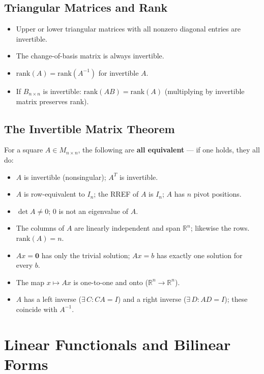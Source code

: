 \documentclass[hidelinks]{article}
\begin{document}
\subsection{Triangular Matrices and Rank}
\begin{itemize}
    \item Upper or lower triangular matrices with all nonzero diagonal entries are invertible.
    \item The change-of-basis matrix is always invertible.
    \item $\mathrm{rank}(A) = \mathrm{rank}(A^{-1})$ for invertible $A$.
    \item If $B_{n\times n}$ is invertible: $\mathrm{rank}(AB) = \mathrm{rank}(A)$ (multiplying by invertible matrix preserves rank).
\end{itemize}

\subsection{The Invertible Matrix Theorem}
For a square $A\in M_{n\times n}$, the following are \textbf{all equivalent} — if one holds, they all do:
\begin{itemize}
    \item $A$ is invertible (nonsingular); $A^T$ is invertible.
    \item $A$ is row-equivalent to $I_n$; the RREF of $A$ is $I_n$; $A$ has $n$ pivot positions.
    \item $\det A \neq 0$; $0$ is not an eigenvalue of $A$.
    \item The columns of $A$ are linearly independent and span $\mathbb{R}^n$; likewise the rows. $\mathrm{rank}(A) = n$.
    \item $Ax=\mathbf 0$ has only the trivial solution; $Ax=b$ has exactly one solution for every $b$.
    \item The map $x\mapsto Ax$ is one-to-one and onto ($\mathbb{R}^n\to\mathbb{R}^n$).
    \item $A$ has a left inverse ($\exists\,C: CA=I$) and a right inverse ($\exists\,D: AD=I$); these coincide with $A^{-1}$.
\end{itemize}

\section{Linear Functionals and Bilinear Forms}
\end{document}
